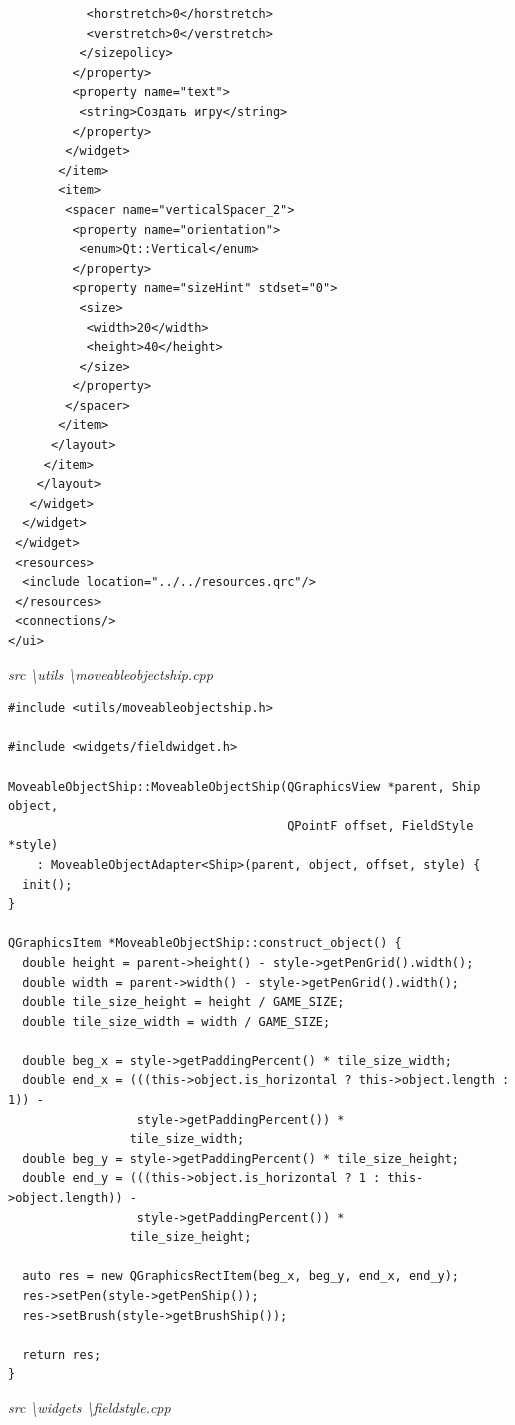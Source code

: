 \documentclass[a4paper,14pt]{extarticle}
\begin{document}
\begin{verbatim}
           <horstretch>0</horstretch>
           <verstretch>0</verstretch>
          </sizepolicy>
         </property>
         <property name="text">
          <string>Создать игру</string>
         </property>
        </widget>
       </item>
       <item>
        <spacer name="verticalSpacer_2">
         <property name="orientation">
          <enum>Qt::Vertical</enum>
         </property>
         <property name="sizeHint" stdset="0">
          <size>
           <width>20</width>
           <height>40</height>
          </size>
         </property>
        </spacer>
       </item>
      </layout>
     </item>
    </layout>
   </widget>
  </widget>
 </widget>
 <resources>
  <include location="../../resources.qrc"/>
 </resources>
 <connections/>
</ui>

\end{verbatim}
\textit{src \textbackslash utils \textbackslash moveableobjectship.cpp}
\begin{verbatim}
#include <utils/moveableobjectship.h>

#include <widgets/fieldwidget.h>

MoveableObjectShip::MoveableObjectShip(QGraphicsView *parent, Ship object,
                                       QPointF offset, FieldStyle *style)
    : MoveableObjectAdapter<Ship>(parent, object, offset, style) {
  init();
}

QGraphicsItem *MoveableObjectShip::construct_object() {
  double height = parent->height() - style->getPenGrid().width();
  double width = parent->width() - style->getPenGrid().width();
  double tile_size_height = height / GAME_SIZE;
  double tile_size_width = width / GAME_SIZE;

  double beg_x = style->getPaddingPercent() * tile_size_width;
  double end_x = (((this->object.is_horizontal ? this->object.length : 1)) -
                  style->getPaddingPercent()) *
                 tile_size_width;
  double beg_y = style->getPaddingPercent() * tile_size_height;
  double end_y = (((this->object.is_horizontal ? 1 : this->object.length)) -
                  style->getPaddingPercent()) *
                 tile_size_height;

  auto res = new QGraphicsRectItem(beg_x, beg_y, end_x, end_y);
  res->setPen(style->getPenShip());
  res->setBrush(style->getBrushShip());

  return res;
}

\end{verbatim}
\textit{src \textbackslash widgets \textbackslash fieldstyle.cpp}
\end{document}
